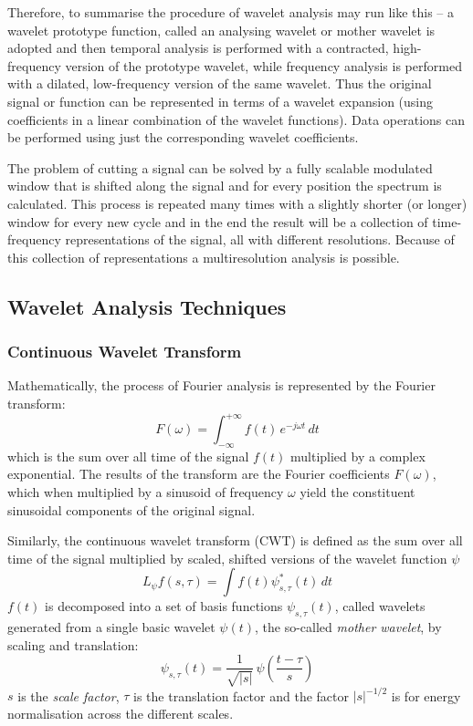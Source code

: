 \documentclass[a4paper,11pt]{article}
\begin{document}
Therefore, to summarise the procedure of wavelet analysis may run like this -- a wavelet prototype function, called an analysing wavelet or mother wavelet is adopted and then temporal analysis is performed with a contracted, high-frequency version of the prototype wavelet, while frequency analysis is performed with a dilated, low-frequency version of the same wavelet. Thus the original signal or function can be represented in terms of a wavelet expansion (using coefficients in a linear combination of the wavelet functions). Data operations can be performed using just the corresponding wavelet coefficients.

The problem of cutting a signal can be solved by a fully scalable modulated window that is shifted along the signal and for every position the spectrum is calculated. This process is repeated many times with a slightly shorter (or longer) window for every new cycle and in the end the result will be a collection of time-frequency representations of the signal, all with different resolutions. Because of this collection of representations a multiresolution analysis is possible.

\subsection{Wavelet Analysis Techniques}
\subsubsection*{Continuous Wavelet Transform}
Mathematically, the process of Fourier analysis is represented by the Fourier transform:
\begin{equation} \label{ft}
F(\omega) = \int_{-\infty}^{+\infty} f(t)\,e^{-j\omega t}\,dt
\end{equation}
which is the sum over all time of the signal $f(t)$ multiplied by a complex exponential. The results of the transform are the Fourier coefficients $F(\omega)$, which when multiplied by a sinusoid of frequency $\omega$ yield the constituent sinusoidal components of the original signal.

Similarly, the continuous wavelet transform (CWT) is defined as the sum over all time of the signal multiplied by scaled, shifted versions of the wavelet function $\psi$ \cite{daub}
\begin{equation} \label{cwt}
L_{\psi}f(s,\tau) = \int f(t)\psi^{\ast}_{s,\tau}(t)\,dt
\end{equation}
$f(t)$ is decomposed into a set of basis functions $\psi_{s,\tau}(t)$, called wavelets generated from a single basic wavelet $\psi(t)$, the so-called \emph{mother wavelet}, by scaling and translation:
\begin{displaymath}
\psi_{s,\tau}(t) = \frac{1}{\sqrt{|s|}} \, \psi \left( \frac{t - \tau}{s} \right)
\end{displaymath}
$s$ is the \emph{scale factor}, $\tau$ is the translation factor and the factor $|s|^{-1/2}$ is for energy normalisation across the different scales.
\end{document}
